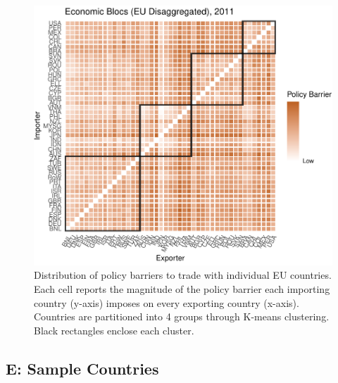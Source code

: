 \documentclass{puthesis}
\begin{document}
\begin{figure}
\centering
\includegraphics{figure/hmEUDC-1.pdf}
\caption{Distribution of policy barriers to trade with individual EU
countries. Each cell reports the magnitude of the policy barrier each
importing country (y-axis) imposes on every exporting country (x-axis).
Countries are partitioned into 4 groups through K-means clustering.
Black rectangles enclose each cluster.}
\end{figure}

\FloatBarrier

\subsection{E: Sample Countries}

\begingroup\fontsize{9}{11}\selectfont
\end{document}
